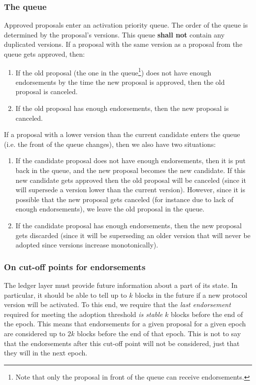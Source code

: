 \subsubsection{The queue}
\label{sec:the-queue}

Approved proposals enter an activation priority queue. The order of the queue is
determined by the proposal's versions. This queue \textbf{shall not} contain any
duplicated versions. If a proposal with the same version as a proposal from the
queue gets approved, then:

\begin{enumerate}
\item If the old proposal (the one in the queue\footnote{Note that only the
    proposal in front of the queue can receive endorsements.}) does not have
  enough endorsements by the time the new proposal is approved, then the old
  proposal is canceled.
\item If the old proposal has enough endorsements, then the new proposal is
  canceled.
\end{enumerate}


If a proposal with a lower version than the current candidate enters the queue
(i.e. the front of the queue changes), then we also have two situations:

\begin{enumerate}
\item If the candidate proposal does not have enough endorsements, then it is
  put back in the queue, and the new proposal becomes the new candidate. If this
  new candidate gets approved then the old proposal will be canceled (since it
  will supersede a version lower than the current version). However, since it is
  possible that the new proposal gets canceled (for instance due to lack of
  enough endorsements), we leave the old proposal in the queue.
\item If the candidate proposal has enough endorsements, then the new proposal
  gets discarded (since it will be superseding an older version that will never
  be adopted since versions increase monotonically).
\end{enumerate}

\subsubsection{On cut-off points for endorsements}
\label{sec:on-cutoff-points-for-endorsements}

The ledger layer must provide future information about a part of its state. In
particular, it should be able to tell up to $k$ blocks in the future if a
new protocol version will be activated. To this end, we require that the
\emph{last endorsement} required for meeting the adoption threshold \emph{is
  stable} $k$ blocks before the end of the epoch. This means that
endorsements for a given proposal for a given epoch are considered up to
$2k$ blocks before the end of that epoch. This is not to say that the
endorsements after this cut-off point will not be considered, just that they
will in the next epoch.

